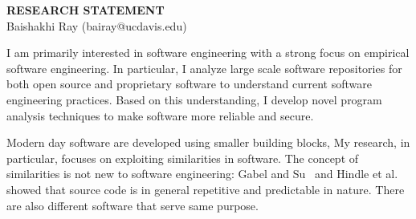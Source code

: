 \documentclass[a4paper, 10pt]{article}
\begin{document}
\thispagestyle{fancy}
\lhead{}
\rhead{}


\pagestyle{fancy}
\rhead{\grayline{\thepage/\totalpages{}}}

\begin{small}

\begin{center}
{\large \bf RESEARCH STATEMENT}\\
\vspace*{0.1cm}
{\normalsize Baishakhi Ray (bairay@ucdavis.edu)}
\end{center}


I am primarily interested in software engineering with a strong focus on empirical software engineering.
In particular, I analyze large scale software repositories for both open source and proprietary software to 
understand current software engineering practices. Based on this understanding, I develop novel program 
analysis techniques to make software more reliable and secure.

Modern day software are developed using smaller building blocks, \eg  
My research, in particular, focuses on exploiting similarities in software. The concept of similarities is not new 
to software engineering: Gabel and Su~\cite{Gabel2010:uniqueness} and Hindle et al.\cite{Hindle:2012} showed 
that source code is in general repetitive and predictable in nature. There are also different software that serve
 same purpose.  


\vspace{0.5cm}


\end{small}
\begin{footnotesize}


\end{footnotesize}
\end{document}
